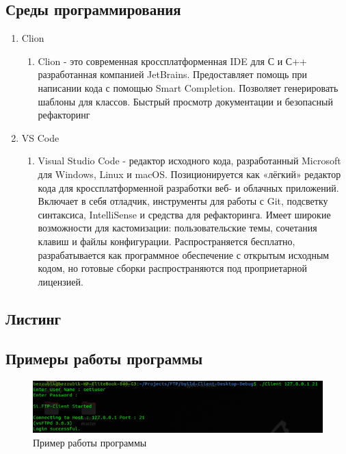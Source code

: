 \subsection{Среды программирования}
\begin{enumerate}
	\item Clion
	\begin{enumerate}
		\item Clion - это современная кроссплатформенная IDE для С и С++ разработанная компанией JetBrains. Предоставляет помощь при написании кода с помощью Smart Completion. Позволяет генерировать шаблоны для классов. Быстрый просмотр документации и безопасный рефакторинг
	\end{enumerate} 
	\item VS Code
	\begin{enumerate}
		\item Visual Studio Code - редактор исходного кода, разработанный Microsoft для Windows, Linux и macOS. Позиционируется как «лёгкий» редактор кода для кроссплатформенной разработки веб- и облачных приложений. Включает в себя отладчик, инструменты для работы с Git, подсветку синтаксиса, IntelliSense и средства для рефакторинга. Имеет широкие возможности для кастомизации: пользовательские темы, сочетания клавиш и файлы конфигурации. Распространяется бесплатно, разрабатывается как программное обеспечение с открытым исходным кодом, но готовые сборки распространяются под проприетарной лицензией.
	\end{enumerate} 
\end{enumerate}

\subsection{Листинг}


\subsection{Примеры работы программы}

\begin{figure}[H]
	\centering
	\includegraphics[width=0.7\linewidth]{src/img/6}
	\caption{Пример работы программы}
	\label{fig:6}
\end{figure}

